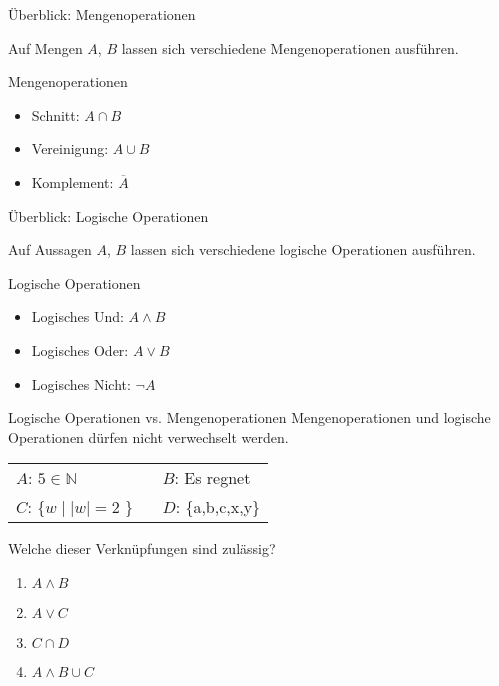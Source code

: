 \begin{frame}{Überblick: Mengenoperationen}

	Auf \alert{Mengen} $A$, $B$ lassen sich verschiedene Mengenoperationen ausführen.

	\begin{exampleblock}{Mengenoperationen}
		\begin{itemize}
			\item Schnitt: $A \cap B$
			\item Vereinigung: $A \cup B$
			\item Komplement: $\overline{A}$
		\end{itemize}
	\end{exampleblock}
\end{frame}

\begin{frame}{Überblick: Logische Operationen}

	Auf \alert{Aussagen} $A$, $B$ lassen sich verschiedene logische Operationen ausführen.

	\begin{exampleblock}{Logische Operationen}
		\begin{itemize}
			\item Logisches Und: $A \wedge B$
			\item Logisches Oder: $A \vee B$
			\item Logisches Nicht: $\neg A$
		\end{itemize}
	\end{exampleblock}
\end{frame}

{
	\begin{frame}{Logische Operationen vs. Mengenoperationen}
		\alert{Mengenoperationen und logische Operationen dürfen nicht verwechselt werden.}
		\begin{table}[]
			\begin{tabular}{l l}
				$A$: $5 \in \mathbb{N}$ & $B$: Es regnet\\
				$C$: \{$w \mid |w|=2$ \} \ & $D$: \{a,b,c,x,y\}\\
			\end{tabular}
		\end{table}
		\begin{block}{Welche dieser Verknüpfungen sind zulässig?}
			\begin{enumerate}
				\item $A \wedge B$
				\item $A \vee C$
				\item $C \cap D$
				\item $A \wedge B \cup C$
			\end{enumerate}
		\end{block}
	\end{frame}
}

